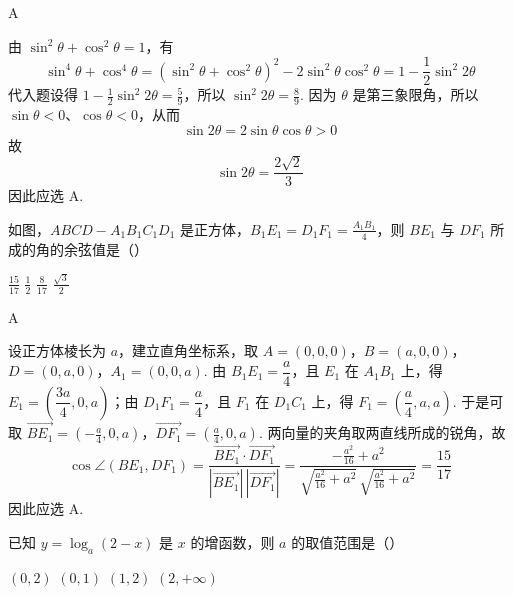 \begin{answer}
A
\end{answer}

\begin{solution}
由 \(\sin^2\theta+\cos^2\theta=1\)，有
\[
\sin^4\theta+\cos^4\theta
 =\left(\sin^2\theta+\cos^2\theta\right)^2-2\sin^2\theta\cos^2\theta
 =1-\frac12\sin^2 2\theta
\]
代入题设得 \(1-\frac12\sin^2 2\theta=\frac59\)，所以 \(\sin^2 2\theta=\frac89\).
因为 \(\theta\) 是第三象限角，所以 \(\sin\theta<0\)、\(\cos\theta<0\)，从而
\[
\sin2\theta=2\sin\theta\cos\theta>0
\]
故
\[
\sin2\theta=\frac{2\sqrt2}{3}
\]
因此应选 A.
\end{solution}

\begin{problem}
如图，\(ABCD - A_{1}B_{1}C_{1}D_{1}\) 是正方体，\(B_{1}E_{1} = D_{1}F_{1} = \frac{A_{1}B_{1}}{4}\)，则 \(BE_{1}\) 与 \(DF_{1}\) 所成的角的余弦值是（\quad）


\choices
    {\(\frac{15}{17}\)}
    {\(\frac{1}{2}\)}
    {\(\frac{8}{17}\)}
    {\(\frac{\sqrt{3}}{2}\)}
\end{problem}

\begin{answer}
A
\end{answer}

\begin{solution}
设正方体棱长为 \(a\)，建立直角坐标系，取 \(A=(0,0,0)\)，\(B=(a,0,0)\)，\(D=(0,a,0)\)，\(A_1=(0,0,a)\).
由 \(B_1E_1=\dfrac{a}{4}\)，且 \(E_1\) 在 \(A_1B_1\) 上，得 \(E_1=\left(\dfrac{3a}{4},0,a\right)\)；由 \(D_1F_1=\dfrac{a}{4}\)，且 \(F_1\) 在 \(D_1C_1\) 上，得 \(F_1=\left(\dfrac{a}{4},a,a\right)\). 于是可取 \(\overrightarrow{BE_1}=\left(-\frac a4,0,a\right)\)，\(\overrightarrow{DF_1}=\left(\frac a4,0,a\right)\).
两向量的夹角取两直线所成的锐角，故
\[
\cos\angle\left(BE_1,DF_1\right)
=\frac{\overrightarrow{BE_1}\cdot\overrightarrow{DF_1}}
{|\overrightarrow{BE_1}|\,|\overrightarrow{DF_1}|}
=\frac{-\frac{a^2}{16}+a^2}
{\sqrt{\frac{a^2}{16}+a^2}\,\sqrt{\frac{a^2}{16}+a^2}}
=\frac{15}{17}
\]
因此应选 A.
\end{solution}

\begin{problem}
已知 \(y = \log_a(2 - x) \) 是 \(x \) 的增函数，则 \(a \) 的取值范围是（\quad）

\choices
    {\((0,2)\)}
    {\((0,1)\)}
    {\((1,2)\)}
    {\((2, + \infty)\)}
\end{problem}

